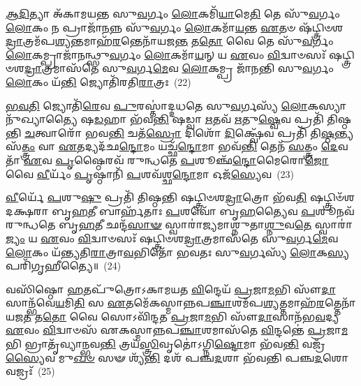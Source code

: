 {\anuvakamend[{\-\ul{𑌅}\-\-\ul{𑌹}\-\-\ul{𑌰}\-\-\ul{𑌨𑍍𑌨𑍇}\-𑌷𑍍𑌵᳴𑌵𑌾\-\ul{𑌨𑍍𑌤}\-𑌰𑍞 𑌷𑍋𑌡᳴𑌶 \ul{𑌸}\-𑌹 \ul{𑌸}\-𑌪𑍍𑌤𑌦᳴𑌶 𑌚}]}%

\-\ul{𑌆}\-\-\ul{𑌦𑌿}\-𑌤𑍍𑌯𑌾 𑌅᳴𑌕𑌾𑌮𑌯𑌨𑍍𑌤 𑌸𑍁\-\ul{𑌵}\-𑌰𑍍𑌗𑌂 \ul{𑌲𑍋}\-𑌕𑌮𑌿᳴\-\ul{𑌯𑌾}\-𑌮𑍇\-\ul{𑌤𑌿} 𑌤𑍇 𑌸𑍁᳴\-\ul{𑌵}\-𑌰𑍍𑌗𑌂 \ul{𑌲𑍋}\-𑌕𑌂 𑌨 𑌪𑍍𑌰𑌾𑌜𑌾᳴\-\ul{𑌨}\-𑌨𑍍𑌨 𑌸𑍁᳴\-\ul{𑌵}\-𑌰𑍍𑌗𑌂 \ul{𑌲𑍋}\-𑌕𑌮𑌾᳴\-\ul{𑌯}\-𑌨𑍍𑌤 \ul{𑌏}\-𑌤𑍞 𑌷᳴𑌟𑍍𑌤𑍍𑌰𑌿𑍞𑌶\-\ul{𑌦𑍍𑌰𑌾}\-𑌤𑍍𑌰𑌮᳴𑌪\-\ul{𑌶𑍍𑌯}\-𑌨𑍍𑌤𑌮𑌾𑌹᳴\-\ul{𑌰}\-𑌨𑍍𑌤𑍇𑌨𑌾᳴𑌯𑌜\-\ul{𑌨𑍍𑌤} 𑌤\-\ul{𑌤𑍋} 𑌵𑍈 𑌤𑍇 𑌸𑍁᳴\-\ul{𑌵}\-𑌰𑍍𑌗𑌂 \ul{𑌲𑍋}\-𑌕𑌮𑍍𑌪𑍍𑌰𑌾𑌜𑌾᳴𑌨𑌨𑍍𑌥𑍍𑌸𑍁\-\ul{𑌵}\-𑌰𑍍𑌗𑌂 \ul{𑌲𑍋}\-𑌕𑌮𑌾᳴\-\ul{𑌯}\-𑌨𑍍 𑌯 \ul{𑌏}\-𑌵𑌂 \ul{𑌵𑌿}\-𑌦𑍍𑌵𑌾𑍞𑌸𑌃᳴ 𑌷𑌟𑍍𑌤𑍍𑌰𑌿𑍞𑌶\-\ul{𑌦𑍍𑌰𑌾}\-𑌤𑍍𑌰𑌮𑌾𑌸᳴𑌤𑍇 𑌸𑍁\-\ul{𑌵}\-𑌰𑍍𑌗\-\ul{𑌮𑍇}\-𑌵 \ul{𑌲𑍋}\-𑌕𑌮𑍍𑌪𑍍𑌰 𑌜𑌾᳴𑌨𑌨𑍍𑌤𑌿 𑌸𑍁\-\ul{𑌵}\-𑌰𑍍𑌗𑌂 \ul{𑌲𑍋}\-𑌕𑌂 𑌯᳴\-\ul{𑌨𑍍𑌤𑌿} 𑌜𑍍𑌯𑍋𑌤𑌿᳴𑌰𑌤𑌿\-\ul{𑌰𑌾}\-𑌤𑍍𑌰𑌃~(22)

\-\ul{𑌭}\-\-\ul{𑌵}\-\-\ul{𑌤𑌿} 𑌜𑍍𑌯𑍋𑌤𑌿᳴\-\ul{𑌰𑍇}\-𑌵 \ul{𑌪𑍁}\-𑌰𑌸𑍍𑌤𑌾॑𑌦𑍍𑌦𑌧𑌤𑍇 𑌸𑍁\-\ul{𑌵}\-𑌰𑍍𑌗𑌸𑍍𑌯᳴ \ul{𑌲𑍋}\-𑌕𑌸𑍍𑌯𑌾𑌨𑍁᳴𑌖𑍍𑌯𑌾𑌤𑍍𑌯𑍈 𑌷\-\ul{𑌡}\-𑌹𑌾 𑌭᳴𑌵\-\ul{𑌨𑍍𑌤𑌿} 𑌷𑌡𑍍𑌵𑌾 \ul{𑌋}\-𑌤𑌵᳴ \ul{𑌋}\-𑌤𑍁\-\ul{𑌷𑍍𑌵𑍇}\-𑌵 𑌪𑍍𑌰𑌤𑌿᳴ 𑌤𑌿𑌷𑍍𑌠𑌨𑍍𑌤𑌿 \ul{𑌚}\-𑌤𑍍𑌵𑌾𑌰𑍋᳴ 𑌭𑌵\-\ul{𑌨𑍍𑌤𑌿} 𑌚𑌤᳴\-\ul{𑌸𑍍𑌰𑍋} 𑌦𑌿𑌶𑍋᳴ \ul{𑌦𑌿}\-𑌕𑍍𑌷𑍍𑌵𑍇᳴𑌵 𑌪𑍍𑌰𑌤𑌿᳴ 𑌤𑌿\-\ul{𑌷𑍍𑌠}\-𑌨𑍍𑌤𑍍𑌯𑌸᳴\-\ul{𑌤𑍍𑌤𑍍𑌰𑌂} 𑌵𑌾 \ul{𑌏}\-𑌤𑌦𑍍𑌯𑌦᳴𑌛\-\ul{𑌨𑍍𑌦𑍋}\-𑌮𑌂 𑌯𑌚𑍍𑌛᳴\-\ul{𑌨𑍍𑌦𑍋}\-𑌮𑌾 𑌭𑌵᳴\-\ul{𑌨𑍍𑌤𑌿} 𑌤𑍇𑌨᳴ \ul{𑌸}\-𑌤𑍍𑌤𑍍𑌰𑌂 \ul{𑌦𑍇}\-𑌵𑌤𑌾᳴ \ul{𑌏}\-𑌵 \ul{𑌪𑍃}\-𑌷𑍍𑌠𑍈𑌰𑌵᳴ 𑌰𑍁𑌨𑍍𑌧𑌤𑍇 \ul{𑌪}\-𑌶𑍂𑌞𑍍𑌛᳴\-\ul{𑌨𑍍𑌦𑍋}\-𑌮𑍈𑌰𑍋\-\ul{𑌜𑍋} 𑌵𑍈 \ul{𑌵𑍀}\-𑌰𑍍𑌯𑌂᳴ \ul{𑌪𑍃}\-𑌷𑍍𑌠𑌾𑌨𑌿᳴ \ul{𑌪}\-𑌶𑌵᳴𑌶𑍍𑌛\-\ul{𑌨𑍍𑌦𑍋}\-𑌮𑌾 𑌓𑌜᳴\-\ul{𑌸𑍍𑌯𑍇}\-𑌵~(23)

\-\ul{𑌵𑍀}\-𑌰𑍍𑌯𑍇᳴ \ul{𑌪}\-𑌶𑍁\-\ul{𑌷𑍁} 𑌪𑍍𑌰𑌤𑌿᳴ 𑌤𑌿𑌷𑍍𑌠𑌨𑍍𑌤𑌿 𑌷𑌟𑍍𑌤𑍍𑌰𑌿𑍞𑌶\-\ul{𑌦𑍍𑌰𑌾}\-𑌤𑍍𑌰𑍋 𑌭᳴𑌵\-\ul{𑌤𑌿} 𑌷𑌟𑍍𑌤𑍍𑌰𑌿𑍞᳴𑌶𑌦𑌕𑍍𑌷𑌰𑌾 𑌬𑍃\-\ul{𑌹}\-𑌤𑍀 𑌬𑌾𑌰𑍍\mbox{}𑌹᳴𑌤𑌾𑌃 \ul{𑌪}\-𑌶𑌵𑍋᳴ 𑌬𑍃\-\ul{𑌹}\-𑌤𑍍𑌯𑍈𑌵 \ul{𑌪}\-𑌶𑍂𑌨𑌵᳴ 𑌰𑍁𑌨𑍍𑌧𑌤𑍇 𑌬𑍃\-\ul{𑌹}\-𑌤𑍀 𑌛𑌨𑍍𑌦᳴\-\ul{𑌸𑌾}\-\-\ul{𑍟} 𑌸𑍍𑌵𑌾𑌰𑌾॑𑌜𑍍𑌯𑌮𑌾𑌶𑍍𑌨𑍁𑌤𑌾\-\ul{𑌶𑍍𑌨𑍁}\-𑌵\-\ul{𑌤𑍇} 𑌸𑍍𑌵𑌾𑌰𑌾॑\-\ul{𑌜𑍍𑌯𑌂} 𑌯 \ul{𑌏}\-𑌵𑌂 \ul{𑌵𑌿}\-𑌦𑍍𑌵𑌾𑍞𑌸𑌃᳴ 𑌷𑌟𑍍𑌤𑍍𑌰𑌿𑍞𑌶\-\ul{𑌦𑍍𑌰𑌾}\-𑌤𑍍𑌰𑌮𑌾𑌸᳴𑌤𑍇 𑌸𑍁\-\ul{𑌵}\-𑌰𑍍𑌗\-\ul{𑌮𑍇}\-𑌵 \ul{𑌲𑍋}\-𑌕𑌂 𑌯᳴𑌨𑍍𑌤𑍍𑌯𑌤𑌿\-\ul{𑌰𑌾}\-𑌤𑍍𑌰𑌾\-\ul{𑌵}\-𑌭𑌿𑌤𑍋᳴ 𑌭𑌵𑌤𑌃 𑌸𑍁\-\ul{𑌵}\-𑌰𑍍𑌗𑌸𑍍𑌯᳴ \ul{𑌲𑍋}\-𑌕\-\ul{𑌸𑍍𑌯} 𑌪𑌰𑌿᳴𑌗𑍃𑌹𑍀𑌤𑍍𑌯𑍈॥~(24)

{\anuvakamend[{\-\ul{𑌅}\-\-\ul{𑌤𑌿}\-\-\ul{𑌰𑌾}\-𑌤𑍍𑌰 𑌓𑌜᳴\-\ul{𑌸𑍍𑌯𑍇}\-𑌵 𑌷𑌟𑍍𑌤𑍍𑌰𑌿𑍞᳴𑌶𑌚𑍍𑌚}]}%

𑌵𑌸𑌿᳴𑌷𑍍𑌠𑍋 \ul{𑌹}\-𑌤𑌪𑍁᳴𑌤𑍍𑌰𑍋\-𑌽𑌕𑌾𑌮𑌯𑌤 \ul{𑌵𑌿}\-𑌨𑍍𑌦𑍇𑌯᳴ \ul{𑌪𑍍𑌰}\-𑌜𑌾\-\ul{𑌮}\-𑌭𑌿 𑌸𑍗᳴\-\ul{𑌦𑌾}\-𑌸𑌾𑌨𑍍𑌭᳴𑌵𑍇\-\ul{𑌯}\-𑌮𑌿\-\ul{𑌤𑌿} 𑌸 \ul{𑌏}\-𑌤𑌮𑍇᳴𑌕𑌸𑍍𑌮𑌾𑌨𑍍𑌨𑌪\-\ul{𑌞𑍍𑌚𑌾}\-𑌶𑌮᳴𑌪\-\ul{𑌶𑍍𑌯}\-𑌤𑍍𑌤𑌮𑌾𑌹᳴\-\ul{𑌰}\-𑌤𑍍𑌤𑍇𑌨𑌾᳴𑌯𑌜\-\ul{𑌤} 𑌤\-\ul{𑌤𑍋} 𑌵𑍈 𑌸𑍋\-𑌽𑌵𑌿᳴𑌨𑍍𑌦𑌤 \ul{𑌪𑍍𑌰}\-𑌜𑌾\-\ul{𑌮}\-𑌭𑌿 𑌸𑍗᳴\-\ul{𑌦𑌾}\-𑌸𑌾𑌨᳴𑌭\-\ul{𑌵}\-𑌦𑍍𑌯 \ul{𑌏}\-𑌵𑌂 \ul{𑌵𑌿}\-𑌦𑍍𑌵𑌾𑍞𑌸᳴ 𑌏𑌕𑌸𑍍𑌮𑌾𑌨𑍍𑌨𑌪\-\ul{𑌞𑍍𑌚𑌾}\-𑌶𑌮𑌾𑌸᳴𑌤𑍇 \ul{𑌵𑌿}\-𑌨𑍍𑌦𑌨𑍍𑌤𑍇॑ \ul{𑌪𑍍𑌰}\-𑌜𑌾\-\ul{𑌮}\-𑌭𑌿 𑌭𑍍𑌰𑌾𑌤𑍃᳴𑌵𑍍𑌯𑌾𑌨𑍍𑌭𑌵\-\ul{𑌨𑍍𑌤𑌿} 𑌤𑍍𑌰𑌯᳴\-\ul{𑌸𑍍𑌤𑍍𑌰𑌿}\-𑌵𑍃𑌤𑍋॑\-𑌽𑌗𑍍𑌨𑌿\-\ul{𑌷𑍍𑌟𑍋}\-𑌮𑌾 𑌭᳴𑌵\-\ul{𑌨𑍍𑌤𑌿} 𑌵𑌜𑍍𑌰᳴\-\ul{𑌸𑍍𑌯𑍈}\-𑌵 𑌮𑍁\-\ul{𑌖}\-\-\ul{𑍞} 𑌸𑍟 𑌶𑍍𑌯᳴\-\ul{𑌨𑍍𑌤𑌿} 𑌦𑌶᳴ 𑌪𑌞𑍍𑌚\-\ul{𑌦}\-𑌶𑌾 𑌭᳴𑌵𑌨𑍍𑌤𑌿 𑌪𑌞𑍍𑌚\-\ul{𑌦}\-𑌶𑍋 𑌵𑌜𑍍𑌰𑌃᳴~(25)

